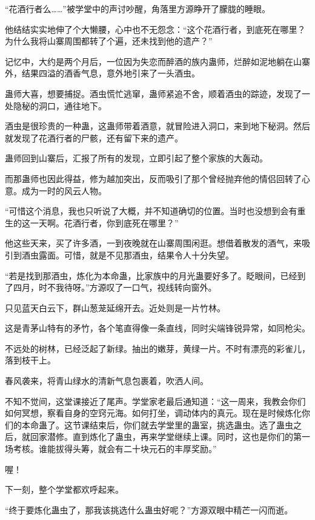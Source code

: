 \begin{this_body}
“花酒行者么……”被学堂中的声讨吵醒，角落里方源睁开了朦胧的睡眼。

他结结实实地伸了个大懒腰，心中也不无怨念：“这个花酒行者，到底死在哪里？为什么我将山寨周围都转了个遍，还未找到他的遗产？”

记忆中，大约是两个月后，一位因为失恋而醉酒的族内蛊师，烂醉如泥地躺在山寨外，结果四溢的酒香气息，意外地引来了一头酒虫。

蛊师大喜，想要捕捉。酒虫慌忙逃窜，蛊师紧追不舍，顺着酒虫的踪迹，发现了一处隐秘的洞口，通往地下。

酒虫是很珍贵的一种蛊，这蛊师带着酒意，就冒险进入洞口，来到地下秘洞。然后就发现了花酒行者的尸骸，还有留下来的遗产。

蛊师回到山寨后，汇报了所有的发现，立即引起了整个家族的大轰动。

而那蛊师也因此得益，修为越加突出，反而吸引了那个曾经抛弃他的情侣回转了心意。成为一时的风云人物。

“可惜这个消息，我也只听说了大概，并不知道确切的位置。当时也没想到会有重生的这一天啊。花酒行者，你到底死在哪里？”

他这些天来，买了许多酒，一到夜晚就在山寨周围闲逛。想借着散发的酒气，来吸引到酒虫露面。可惜，就是不见那酒虫，结果令人十分失望。

“若是找到那酒虫，炼化为本命蛊，比家族中的月光蛊要好多了。眨眼间，已经到了四月，时不我待呀。”方源叹了一口气，视线转向窗外。

只见蓝天白云下，群山葱茏延绵开去。近处则是一片竹林。

这是青茅山特有的矛竹，各个笔直得像一条直线，同时尖端锋锐异常，如同枪尖。

不远处的树林，已经泛起了新绿。抽出的嫩芽，黄绿一片。不时有漂亮的彩雀儿，落到枝干上。

春风袭来，将青山绿水的清新气息包裹着，吹洒人间。

不知不觉间，这堂课接近了尾声。学堂家老最后通知道：“这一周来，我教会你们如何冥想，察看自身的空窍元海。如何打坐，调动体内的真元。现在是时候炼化你们的本命蛊了。这节课结束后，你们就去学堂里的蛊室，挑选蛊虫。选了蛊虫之后，就回家潜修。直到炼化了蛊虫，再来学堂继续上课。同时，这也是你们的第一场考核。谁能拔得头筹，就会有二十块元石的丰厚奖励。”

喔！

下一刻，整个学堂都欢呼起来。

“终于要炼化蛊虫了，那我该挑选什么蛊虫好呢？”方源双眼中精芒一闪而逝。

\end{this_body}

